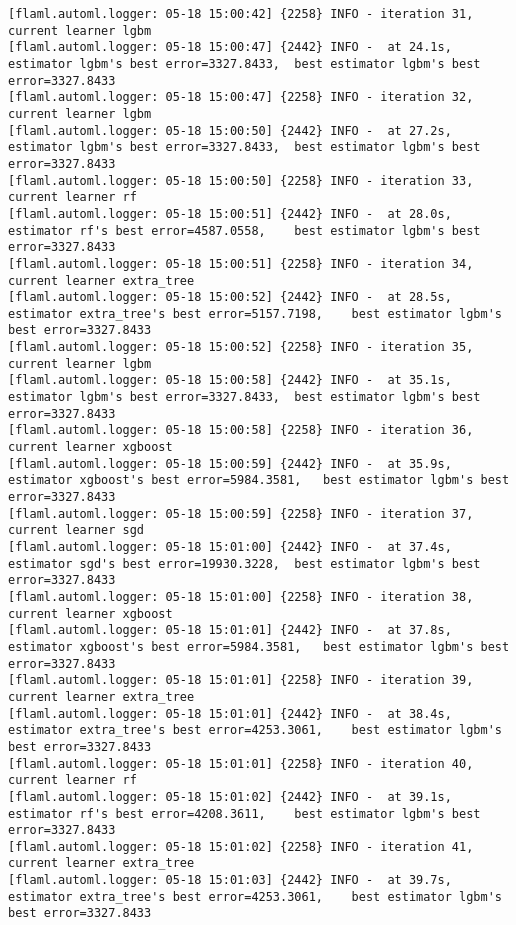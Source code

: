 \documentclass[
  letterpaper,
  DIV=11,
  numbers=noendperiod]{scrreprt}
\begin{document}
\begin{verbatim}
[flaml.automl.logger: 05-18 15:00:42] {2258} INFO - iteration 31, current learner lgbm
[flaml.automl.logger: 05-18 15:00:47] {2442} INFO -  at 24.1s,  estimator lgbm's best error=3327.8433,  best estimator lgbm's best error=3327.8433
[flaml.automl.logger: 05-18 15:00:47] {2258} INFO - iteration 32, current learner lgbm
[flaml.automl.logger: 05-18 15:00:50] {2442} INFO -  at 27.2s,  estimator lgbm's best error=3327.8433,  best estimator lgbm's best error=3327.8433
[flaml.automl.logger: 05-18 15:00:50] {2258} INFO - iteration 33, current learner rf
[flaml.automl.logger: 05-18 15:00:51] {2442} INFO -  at 28.0s,  estimator rf's best error=4587.0558,    best estimator lgbm's best error=3327.8433
[flaml.automl.logger: 05-18 15:00:51] {2258} INFO - iteration 34, current learner extra_tree
[flaml.automl.logger: 05-18 15:00:52] {2442} INFO -  at 28.5s,  estimator extra_tree's best error=5157.7198,    best estimator lgbm's best error=3327.8433
[flaml.automl.logger: 05-18 15:00:52] {2258} INFO - iteration 35, current learner lgbm
[flaml.automl.logger: 05-18 15:00:58] {2442} INFO -  at 35.1s,  estimator lgbm's best error=3327.8433,  best estimator lgbm's best error=3327.8433
[flaml.automl.logger: 05-18 15:00:58] {2258} INFO - iteration 36, current learner xgboost
[flaml.automl.logger: 05-18 15:00:59] {2442} INFO -  at 35.9s,  estimator xgboost's best error=5984.3581,   best estimator lgbm's best error=3327.8433
[flaml.automl.logger: 05-18 15:00:59] {2258} INFO - iteration 37, current learner sgd
[flaml.automl.logger: 05-18 15:01:00] {2442} INFO -  at 37.4s,  estimator sgd's best error=19930.3228,  best estimator lgbm's best error=3327.8433
[flaml.automl.logger: 05-18 15:01:00] {2258} INFO - iteration 38, current learner xgboost
[flaml.automl.logger: 05-18 15:01:01] {2442} INFO -  at 37.8s,  estimator xgboost's best error=5984.3581,   best estimator lgbm's best error=3327.8433
[flaml.automl.logger: 05-18 15:01:01] {2258} INFO - iteration 39, current learner extra_tree
[flaml.automl.logger: 05-18 15:01:01] {2442} INFO -  at 38.4s,  estimator extra_tree's best error=4253.3061,    best estimator lgbm's best error=3327.8433
[flaml.automl.logger: 05-18 15:01:01] {2258} INFO - iteration 40, current learner rf
[flaml.automl.logger: 05-18 15:01:02] {2442} INFO -  at 39.1s,  estimator rf's best error=4208.3611,    best estimator lgbm's best error=3327.8433
[flaml.automl.logger: 05-18 15:01:02] {2258} INFO - iteration 41, current learner extra_tree
[flaml.automl.logger: 05-18 15:01:03] {2442} INFO -  at 39.7s,  estimator extra_tree's best error=4253.3061,    best estimator lgbm's best error=3327.8433

\end{verbatim}
\end{document}
